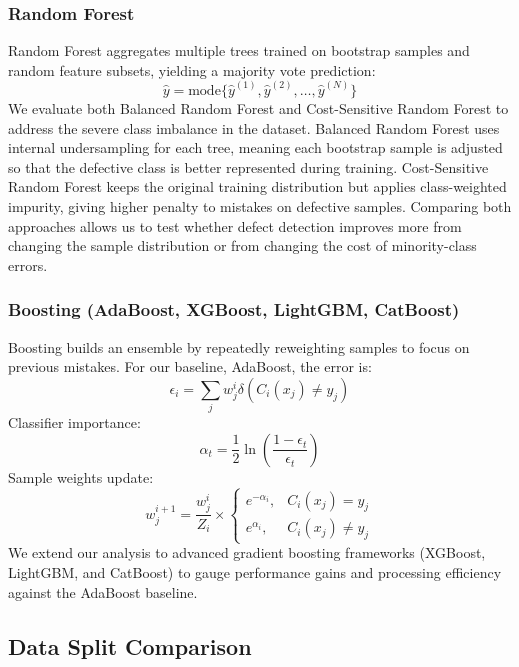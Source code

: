 \documentclass{article}
\begin{document}
\subsubsection*{Random Forest}
Random Forest aggregates multiple trees trained on bootstrap samples and random feature subsets,
yielding a majority vote prediction:
\begin{equation}
\hat{y} = \mathrm{mode}\{\hat{y}^{(1)}, \hat{y}^{(2)}, \ldots, \hat{y}^{(N)}\}
\end{equation}
We evaluate both Balanced Random Forest and Cost-Sensitive Random Forest to address the severe class imbalance in the dataset. Balanced Random Forest uses internal undersampling for each tree, meaning each bootstrap sample is adjusted so that the defective class is better represented during training. Cost-Sensitive Random Forest keeps the original training distribution but applies class-weighted impurity, giving higher penalty to mistakes on defective samples. Comparing both approaches allows us to test whether defect detection improves more from changing the sample distribution or from changing the cost of minority-class errors.
 
\subsubsection*{Boosting (AdaBoost, XGBoost, LightGBM, CatBoost)}
Boosting builds an ensemble by repeatedly reweighting samples to focus on previous mistakes. For our baseline, AdaBoost, the error is:
\begin{equation}
\epsilon_i = \sum_{j} w_j^i \delta(C_i(x_j) \neq y_j)
\end{equation}
Classifier importance:
\begin{equation}
\alpha_{t} = \frac{1}{2} \ln\left(\frac{1 - \epsilon_{t}}{\epsilon_{t}}\right)
\end{equation}
Sample weights update:
\begin{equation}
w_{j}^{i+1} = \frac{w_{j}^{i}}{Z_{i}} \times \begin{cases} e^{-\alpha_{i}}, & C_{i}(x_{j}) = y_{j} \\ e^{\alpha_{i}}, & C_{i}(x_{j}) \neq y_{j} \end{cases}
\end{equation}
We extend our analysis to advanced gradient boosting frameworks (XGBoost, LightGBM, and CatBoost) to gauge performance gains and processing efficiency against the AdaBoost baseline.
 
\subsection{Data Split Comparison}
\end{document}
